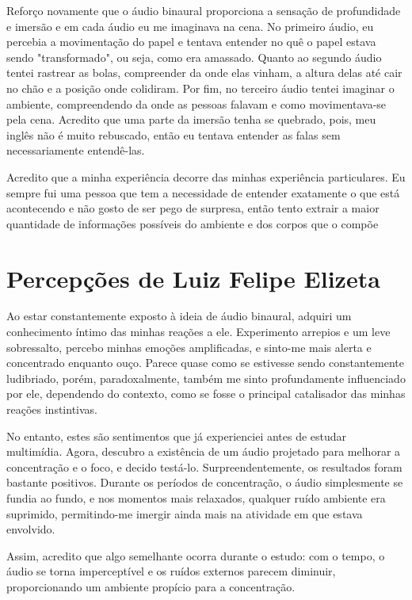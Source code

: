 \hspace{1.5 cm} Reforço novamente que o áudio binaural proporciona a sensação de profundidade e imersão e em cada áudio eu me imaginava na cena. No primeiro áudio, eu percebia a movimentação do papel e tentava entender no quê o papel estava sendo "transformado", ou seja, como era amassado. Quanto ao segundo áudio tentei rastrear as bolas, compreender da onde elas vinham, a altura delas até cair no chão e a posição onde colidiram. Por fim, no terceiro áudio tentei imaginar o ambiente, compreendendo da onde as pessoas falavam e como movimentava-se pela cena. Acredito que uma parte da imersão tenha se quebrado, pois, meu inglês não é muito rebuscado, então eu tentava entender as falas sem necessariamente entendê-las.

\hspace{1.5 cm} Acredito que a minha experiência decorre das minhas experiência particulares. Eu sempre fui uma pessoa que tem a necessidade de entender exatamente o que está acontecendo e não gosto de ser pego de surpresa, então tento extrair a maior quantidade de informações possíveis do ambiente e dos corpos que o compõe

\section{Percepções de Luiz Felipe Elizeta}

Ao estar constantemente exposto à ideia de áudio binaural, adquiri um conhecimento íntimo das minhas reações a ele. Experimento arrepios e um leve sobressalto, percebo minhas emoções amplificadas, e sinto-me mais alerta e concentrado enquanto ouço. Parece quase como se estivesse sendo constantemente ludibriado, porém, paradoxalmente, também me sinto profundamente influenciado por ele, dependendo do contexto, como se fosse o principal catalisador das minhas reações instintivas.

\hspace{1.5 cm} No entanto, estes são sentimentos que já experienciei antes de estudar multimídia. Agora, descubro a existência de um áudio projetado para melhorar a concentração e o foco, e decido testá-lo. Surpreendentemente, os resultados foram bastante positivos. Durante os períodos de concentração, o áudio simplesmente se fundia ao fundo, e nos momentos mais relaxados, qualquer ruído ambiente era suprimido, permitindo-me imergir ainda mais na atividade em que estava envolvido.

\hspace{1.5 cm} Assim, acredito que algo semelhante ocorra durante o estudo: com o tempo, o áudio se torna imperceptível e os ruídos externos parecem diminuir, proporcionando um ambiente propício para a concentração.
